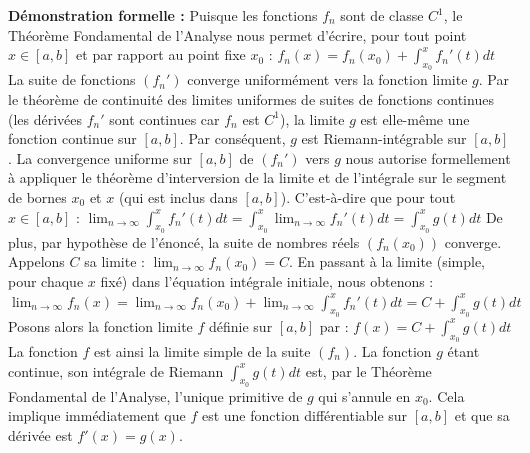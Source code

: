 \documentclass{report}
\begin{document}
\textbf{Démonstration formelle :}
Puisque les fonctions $f_n$ sont de classe $C^1$, le Théorème Fondamental de l'Analyse nous permet d'écrire, pour tout point $x \in [a,b]$ et par rapport au point fixe $x_0$ :
$f_n(x) = f_n(x_0) + \int_{x_0}^x f_n'(t) dt$
La suite de fonctions $(f_n')$ converge uniformément vers la fonction limite $g$. Par le théorème de continuité des limites uniformes de suites de fonctions continues (les dérivées $f_n'$ sont continues car $f_n$ est $C^1$), la limite $g$ est elle-même une fonction continue sur $[a,b]$.
Par conséquent, $g$ est Riemann-intégrable sur $[a,b]$.
La convergence uniforme sur $[a,b]$ de $(f_n')$ vers $g$ nous autorise formellement à appliquer le théorème d'interversion de la limite et de l'intégrale sur le segment de bornes $x_0$ et $x$ (qui est inclus dans $[a,b]$).
C'est-à-dire que pour tout $x \in [a,b]$ :
$\lim_{n \to \infty} \int_{x_0}^x f_n'(t) dt = \int_{x_0}^x \lim_{n \to \infty} f_n'(t) dt = \int_{x_0}^x g(t) dt$
De plus, par hypothèse de l'énoncé, la suite de nombres réels $(f_n(x_0))$ converge. Appelons $C$ sa limite : $\lim_{n \to \infty} f_n(x_0) = C$.
En passant à la limite (simple, pour chaque $x$ fixé) dans l'équation intégrale initiale, nous obtenons :
$\lim_{n \to \infty} f_n(x) = \lim_{n \to \infty} f_n(x_0) + \lim_{n \to \infty} \int_{x_0}^x f_n'(t) dt = C + \int_{x_0}^x g(t) dt$
Posons alors la fonction limite $f$ définie sur $[a,b]$ par :
$f(x) = C + \int_{x_0}^x g(t) dt$
La fonction $f$ est ainsi la limite simple de la suite $(f_n)$.
La fonction $g$ étant continue, son intégrale de Riemann $\int_{x_0}^x g(t) dt$ est, par le Théorème Fondamental de l'Analyse, l'unique primitive de $g$ qui s'annule en $x_0$.
Cela implique immédiatement que $f$ est une fonction différentiable sur $[a,b]$ et que sa dérivée est $f'(x) = g(x)$.
\end{document}

